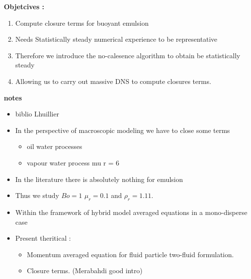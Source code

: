 \textbf{Objetcives : }

\begin{enumerate}
    \item Compute closure terms for buoyant emulsion
    \item Needs Statistically steady numerical experience to be representative 
    \item Therefore we introduce the no-calesence algorithm to obtain be statistically steady
    \item Allowing us to carry out massive DNS to compute closures terms. 
\end{enumerate}
\vspace*{1cm}
\textbf{notes}
\begin{itemize}
    \item biblio Lhuillier
    \item In the perspective of macroscopic modeling we have to close some terms 
    \begin{itemize}
        \item oil water processes
        \item vapour water process mu r = 6 
    \end{itemize}
    \item In the literature there is absolutely nothing for emulsion 
    \item Thus we study $Bo = 1$ $\mu_r = 0.1$ and $\rho_r = 1.11$. 
    \item Within the framework of hybrid model averaged equations in a mono-disperse case 
    \item Present theritical : 
     \begin{itemize}
        \item Momentum averaged equation for fluid particle two-fluid formulation. 
        \item Closure terms. (Merabahdi good intro)
    \end{itemize}
\end{itemize}



